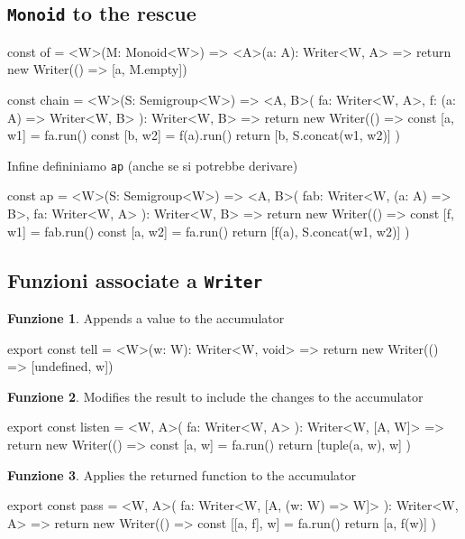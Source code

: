 \documentclass[12pt]{article}
\theoremstyle{definition}
\newtheorem{function}{Funzione}[section]
\newenvironment{code}
  {\vspace{0.5cm} \VerbatimEnvironment\begin{typescriptcode}}
  {\end{typescriptcode} \vspace{0.2cm}}
\begin{document}
\subsection{\texttt{Monoid} to the rescue}

\begin{code}
const of = <W>(M: Monoid<W>) => <A>(a: A): Writer<W, A> => {
  return new Writer(() => [a, M.empty])
}

const chain = <W>(S: Semigroup<W>) => <A, B>(
  fa: Writer<W, A>,
  f: (a: A) => Writer<W, B>
): Writer<W, B> => {
  return new Writer(() => {
    const [a, w1] = fa.run()
    const [b, w2] = f(a).run()
    return [b, S.concat(w1, w2)]
  })
}
\end{code}

Infine defininiamo \texttt{ap} (anche se si potrebbe derivare)

\begin{code}
const ap = <W>(S: Semigroup<W>) => <A, B>(
  fab: Writer<W, (a: A) => B>,
  fa: Writer<W, A>
): Writer<W, B> => {
  return new Writer(() => {
    const [f, w1] = fab.run()
    const [a, w2] = fa.run()
    return [f(a), S.concat(w1, w2)]
  })
}
\end{code}

\subsection{Funzioni associate a \texttt{Writer}}

\begin{function}
Appends a value to the accumulator

\begin{code}
export const tell = <W>(w: W): Writer<W, void> => {
  return new Writer(() => [undefined, w])
}
\end{code}
\end{function}

\begin{function}
Modifies the result to include the changes to the accumulator

\begin{code}
export const listen = <W, A>(
  fa: Writer<W, A>
): Writer<W, [A, W]> => {
  return new Writer(() => {
    const [a, w] = fa.run()
    return [tuple(a, w), w]
  })
}
\end{code}
\end{function}

\begin{function}
Applies the returned function to the accumulator

\begin{code}
export const pass = <W, A>(
  fa: Writer<W, [A, (w: W) => W]>
): Writer<W, A> => {
  return new Writer(() => {
    const [[a, f], w] = fa.run()
    return [a, f(w)]
  })
}
\end{code}
\end{function}
\end{document}
